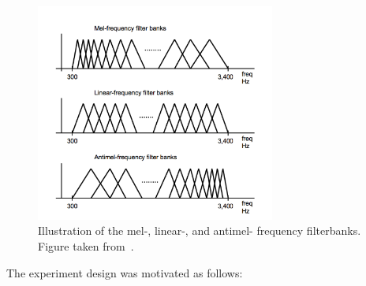 \begin{figure}[ht]
  \centering
  \includegraphics[width=0.7\textwidth]{figures/filterbanks.png}
  \caption{Illustration of the mel-, linear-, and antimel- frequency
  filterbanks. Figure taken from~\cite{lei2009mel}.}\label{fig:filterbanks}
\end{figure}

The experiment design was motivated as follows:

